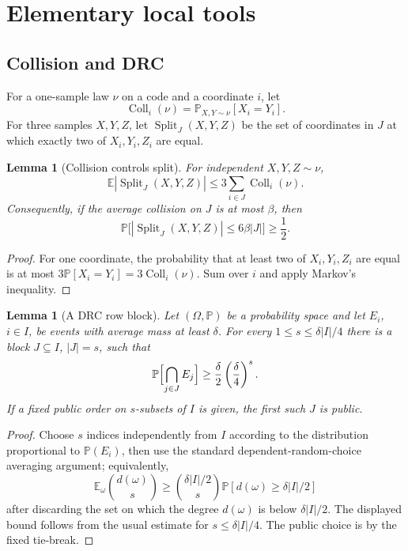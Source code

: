 \documentclass[11pt]{article}
\newtheorem{lemma}[theorem]{Lemma}
\theoremstyle{remark}
\newcommand{\E}{\mathbb E}
\newcommand{\Prob}{\mathbb P}
\newcommand{\Split}{\operatorname{Split}}
\newcommand{\Coll}{\operatorname{Coll}}
\begin{document}
\section{Elementary local tools}

\subsection{Collision and DRC}

For a one-sample law $\nu$ on a code and a coordinate $i$, let
\[
        \Coll_i(\nu)=\Prob_{X,Y\sim\nu}[X_i=Y_i].
\]
For three samples $X,Y,Z$, let $\Split_J(X,Y,Z)$ be the set of coordinates in $J$ at which exactly two of $X_i,Y_i,Z_i$ are equal.

\begin{lemma}[Collision controls split]\label{lem:collision-split}
For independent $X,Y,Z\sim\nu$,
\[
        \E |\Split_J(X,Y,Z)|\le 3\sum_{i\in J}\Coll_i(\nu).
\]
Consequently, if the average collision on $J$ is at most $\beta$, then
\[
        \Prob\bigl[|\Split_J(X,Y,Z)|\le 6\beta |J|\bigr]\ge \frac{1}{2}.
\]
\end{lemma}

\begin{proof}
For one coordinate, the probability that at least two of $X_i,Y_i,Z_i$ are equal is at most $3\Prob[X_i=Y_i]=3\Coll_i(\nu)$.  Sum over $i$ and apply Markov's inequality.
\end{proof}

\begin{lemma}[A DRC row block]\label{lem:drc}
Let $(\Omega,\Prob)$ be a probability space and let $E_i$, $i\in I$, be events with average mass at least $\delta$.  For every $1\le s\le \delta |I|/4$ there is a block $J\subseteq I$, $|J|=s$, such that
\[
        \Prob\Bigl[\bigcap_{j\in J}E_j\Bigr]\ge \frac{\delta}{2}\left(\frac{\delta}{4}\right)^s.
\]
If a fixed public order on $s$-subsets of $I$ is given, the first such $J$ is public.
\end{lemma}

\begin{proof}
Choose $s$ indices independently from $I$ according to the distribution proportional to $\Prob(E_i)$, then use the standard dependent-random-choice averaging argument; equivalently,
\[
        \E_{\omega}\binom{d(\omega)}{s}\ge \binom{\delta |I|/2}{s}\Prob[d(\omega)\ge \delta |I|/2]
\]
after discarding the set on which the degree $d(\omega)$ is below $\delta |I|/2$.  The displayed bound follows from the usual estimate for $s\le \delta |I|/4$.  The public choice is by the fixed tie-break.
\end{proof}
\end{document}
